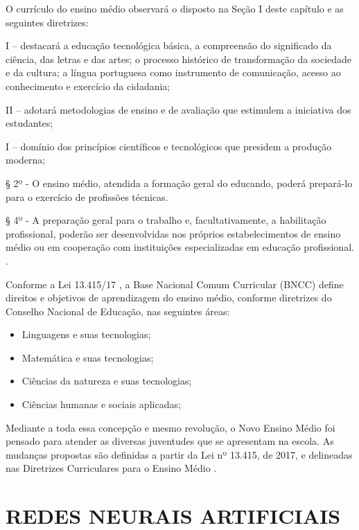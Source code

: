 \begin{citacao}
    O currículo do ensino médio observará o disposto na Seção I deste capítulo e as seguintes diretrizes:

    I – destacará a educação tecnológica básica, a compreensão do significado da ciência, das letras e das artes; o processo histórico de transformação da sociedade e da cultura; a língua portuguesa como instrumento de comunicação, acesso ao conhecimento e exercício da cidadania;
    
    II – adotará metodologias de ensino e de avaliação que estimulem a iniciativa dos estudantes;
    
    I – domínio dos princípios científicos e tecnológicos que presidem a produção moderna;
    
    § 2º - O ensino médio, atendida a formação geral do educando, poderá prepará-lo para o exercício de profissões técnicas.
    
    § 4º - A preparação geral para o trabalho e, facultativamente, a habilitação profissional, poderão ser desenvolvidas nos próprios estabelecimentos de ensino médio ou em cooperação com instituições especializadas em educação profissional. \cite{lei9394}.
\end{citacao}

Conforme a Lei 13.415/17 \cite{lei13415}, a Base Nacional Comum Curricular \sigla(BNCC) define direitos e objetivos de aprendizagem do ensino médio, conforme diretrizes do Conselho Nacional de Educação, nas seguintes áreas:

\begin{itemize}
	\item Linguagens e suas tecnologias;
	\item Matemática e suas tecnologias;
	\item Ciências da natureza e suas tecnologias;
	\item Ciências humanas e sociais aplicadas;
\end{itemize}

Mediante a toda essa concepção e mesmo revolução, o Novo Ensino Médio foi pensado para atender as diversas juventudes que se apresentam na escola. As mudanças propostas são definidas a partir da Lei nº 13.415, de 2017, e delineadas nas Diretrizes Curriculares para o Ensino Médio \cite{res32016}.

\section{REDES NEURAIS ARTIFICIAIS}


